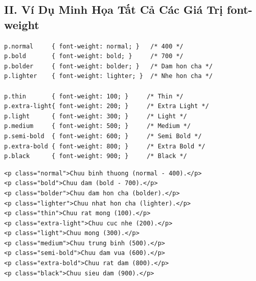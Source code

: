 \documentclass[11pt,oneside]{book}
\begin{document}
\subsection*{II. Ví Dụ Minh Họa Tất Cả Các Giá Trị font-weight}

\begin{codeWindow}
\begin{lstlisting}[language=CSS3]
p.normal     { font-weight: normal; }   /* 400 */
p.bold       { font-weight: bold; }     /* 700 */
p.bolder     { font-weight: bolder; }   /* Dam hon cha */
p.lighter    { font-weight: lighter; }  /* Nhe hon cha */

p.thin       { font-weight: 100; }     /* Thin */
p.extra-light{ font-weight: 200; }     /* Extra Light */
p.light      { font-weight: 300; }     /* Light */
p.medium     { font-weight: 500; }     /* Medium */
p.semi-bold  { font-weight: 600; }     /* Semi Bold */
p.extra-bold { font-weight: 800; }     /* Extra Bold */
p.black      { font-weight: 900; }     /* Black */
\end{lstlisting}
\end{codeWindow}

\begin{codeWindow}
\begin{lstlisting}[language=HTML5]
<p class="normal">Chuu binh thuong (normal - 400).</p>
<p class="bold">Chuu dam (bold - 700).</p>
<p class="bolder">Chuu dam hon cha (bolder).</p>
<p class="lighter">Chuu nhat hon cha (lighter).</p>
<p class="thin">Chuu rat mong (100).</p>
<p class="extra-light">Chuu cuc nhe (200).</p>
<p class="light">Chuu mong (300).</p>
<p class="medium">Chuu trung binh (500).</p>
<p class="semi-bold">Chuu dam vua (600).</p>
<p class="extra-bold">Chuu rat dam (800).</p>
<p class="black">Chuu sieu dam (900).</p>
\end{lstlisting}
\end{codeWindow}
\end{document}
